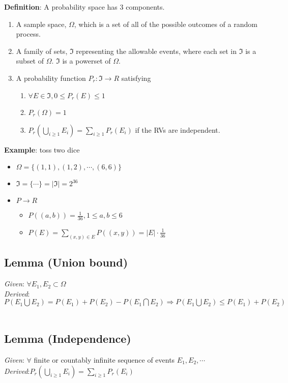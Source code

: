 \documentclass[12pt]{article}
\begin{document}
\textbf{Definition}: A probability space has 3 components.
\begin{enumerate}[noitemsep]
\item A sample space, $\Omega$, which is a set of all of the possible outcomes of a random process.
\item A family of sets, $\Im$ representing the allowable events, where each set in $\Im$ is a subset of $\Omega$. $\Im$ is a powerset of $\Omega$.
\item A probability function $P_r: \Im \rightarrow R$ satisfying
\begin{enumerate}[noitemsep]
\item $\forall E \in \Im, 0 \le P_r(E) \le 1$
\item $P_r(\Omega) = 1$
\item $P_r(\bigcup\limits_{i \ge 1} E_{i}) = \sum\limits_{i \ge 1}P_r(E_i)$ if the RVs are independent.
\end{enumerate}
\end{enumerate}

\textbf{Example}: toss two dice

\begin{itemize}
\item $\Omega = \{(1, 1), (1, 2), \cdots, (6, 6)\}$
\item $\Im = \{\cdots\} = |\Im| = 2^{36}$
\item $P \rightarrow R$
\begin{itemize}
\item $P((a, b)) = \frac{1}{36}, 1 \le a, b \le 6$
\item $P(E) = \sum \limits_{(x, y) \in E} P((x, y)) = |E| \cdot \frac{1}{36}$
\end{itemize}
\end{itemize}

\subsection{Lemma (Union bound)}
\textit{Given}: $\forall E_1, E_2 \subset \Omega$
\\
\textit{Derived}: $P(E_1 \bigcup E_2) = P(E_1) + P(E_2) - P (E_1 \bigcap E_2) \Rightarrow P(E_1 \bigcup E_2) \le P(E_1) + P(E_2)$
\\ \\
\subsection{Lemma (Independence)} 
\textit{Given}: $\forall$ finite or countably infinite sequence of events $E_1, E_2, \cdots$
\\
\textit{Derived}:$P_r(\bigcup\limits_{i \ge 1} E_{i}) = \sum\limits_{i \ge 1}P_r(E_i)$ 
\\ \\
\end{document}
